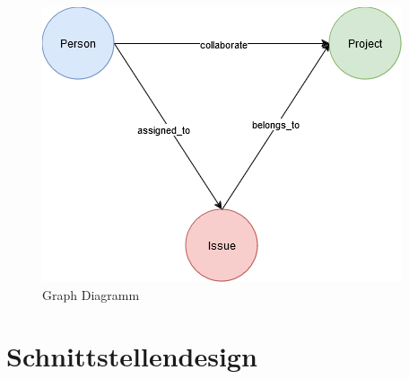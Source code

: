 \begin{figure}[H]
	\centering
	\includegraphics[scale=.8]{Illustrations/graph_diagram}
	\caption{Graph Diagramm}
\end{figure}


\section{Schnittstellendesign} %
\label{sec:schnittstellendesign}

